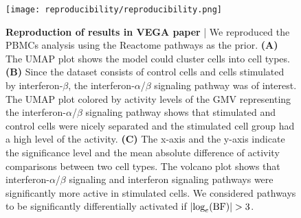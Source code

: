 \begin{figure}[h!]
    \centering
    \texttt{[image: reproducibility/reproducibility.png]}
    \caption{\small{\textbf{Reproduction of results in VEGA paper} | We reproduced the PBMCs analysis using the Reactome pathways as the prior. \textbf{(A)} The UMAP plot shows the model could cluster cells into cell types. \textbf{(B)} Since the dataset consists of control cells and cells stimulated by interferon-$\beta$, the interferon-$\alpha$/$\beta$ signaling pathway was of interest. The UMAP plot colored by activity levels of the GMV representing the interferon-$\alpha$/$\beta$ signaling pathway shows that stimulated and control cells were nicely separated and the stimulated cell group had a high level of the activity. \textbf{(C)} The x-axis and the y-axis indicate the significance level and the mean absolute difference of activity comparisons between two cell types. The volcano plot shows that interferon-$\alpha$/$\beta$ signaling and interferon signaling pathways were significantly more active in stimulated cells. We considered pathways to be significantly differentially activated if $|\textnormal{log}_e(\textnormal{BF})|>3$.}}
    \label{fig:reproducibility}
\end{figure}

